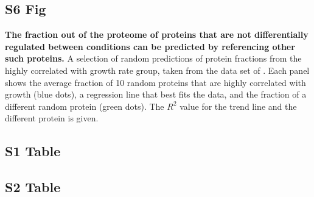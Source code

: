 \documentclass[10pt,letterpaper]{article}
\begin{document}
\subsection*{S6 Fig}
\label{fig:randpred}
    {\bf The fraction out of the proteome of proteins that are not differentially regulated between conditions can be predicted by referencing other such proteins.}
  A selection of random predictions of protein fractions from the highly correlated with growth rate group, taken from the data set of \cite{Schmidt2015}.
  Each panel shows the average fraction of 10 random proteins that are highly correlated with growth (blue dots), a regression line that best fits the data, and the fraction of a different random protein (green dots).
  The $R^2$ value for the trend line and the different protein is given.
%

\subsection*{S1 Table}
\label{tab:corrbreakdownh}
\begin{table}[h]
\centering
{}
\caption{
    {\bf Breakdown by function of strongly positively correlated with growth rate proteins in the data set from \cite{Schmidt2015}.}
}
\end{table}

\subsection*{S2 Table}
\label{tab:corrbreakdownv}
\begin{table}[h]
\centering
{}
\caption{
    {\bf Breakdown by function of strongly positively correlated with growth rate proteins in the data set from \cite{Peebo_2015}.}
}
\end{table}
\end{document}
